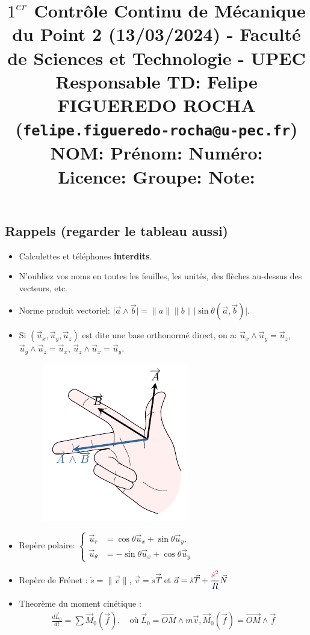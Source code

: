 \documentclass[french,10pt,twocolumn]{article}
\title{\vspace{-1cm} \large $1^{er}$ Contrôle Continu de Mécanique du Point 2 (13/03/2024) - 	Faculté de Sciences et Technologie - UPEC \\ 	Responsable TD: Felipe FIGUEREDO ROCHA (\texttt{felipe.figueredo-rocha@u-pec.fr}) \\
	NOM:\underline{\hspace{7cm}} Prénom: \underline{\hspace{5cm}}  Numéro: \underline{\hspace{2cm}} \\
	Licence:\underline{\hspace{7cm}} Groupe: \underline{\hspace{5cm}} Note: \underline{\hspace{1.5cm}}
	\vspace{-2cm}}
\author{}
\date{}
\begin{document}
	\maketitle
	
	\vspace{-0.5cm}
	\subsection*{Rappels (regarder le tableau aussi)}
	\begin{itemize}
		\item Calculettes et téléphones \textbf{interdits}.
		\item N'oubliez vos noms en toutes les feuilles, les unités, des flèches au-dessus des vecteurs, etc.
		\item Norme produit vectoriel: |$\vec{a} \wedge \vec{b}| =  \|a\| \|b\| |\sin{\theta}(\vec{a}, \vec{b})|$.
		\item Si $(\vec{u}_x, \vec{u}_y, \vec{u}_z)$ est dite une base orthonormé direct, on a: $\vec{u}_x \wedge \vec{u}_y = \vec{u}_z$, $\vec{u}_y \wedge \vec{u}_z = \vec{u}_x$, $\vec{u}_z \wedge \vec{u}_x = \vec{u}_y$.
		\begin{figure}[h!]
			\centering
			\includegraphics[width=0.3\linewidth]{regle_de_la_main_droite}
			\caption*{}
			\label{fig:regledelamaindroite}
		\end{figure}
		\vspace{-1cm}
		\item Repère polaire:
		$ \begin{cases}
			\vec{u}_r &= \cos{\theta} \Vec{u}_x + \sin{\theta} \Vec{u}_y,\\ 
			\vec{u}_{\theta} &= -\sin{\theta} \vec{u}_x + \cos{\theta} \Vec{u}_y
		\end{cases}
		$ 	
		\item Repère de Frénet : $\dot{s} = \|\vec{v}\|$, $\vec{v} = \dot{s} \vec{T}$ et 
		$\vec{a} = \ddot{s} \vec{T} + \dfrac{\color{red}{\dot{s}^2}}{R} \vec{N}$
		\item Theorème du moment cinétique :
		\begin{align*}
			\frac{d \vec{L}_0}{d t} = \sum \vec{M}_0(\vec{f}), \quad \text{où} \; \vec{L}_0 = \vec{OM}\wedge m\vec{v}, \vec{M}_0(\vec{f}) = \vec{OM}\wedge \vec{f}
		\end{align*}
	\end{itemize}
	
\end{document}

